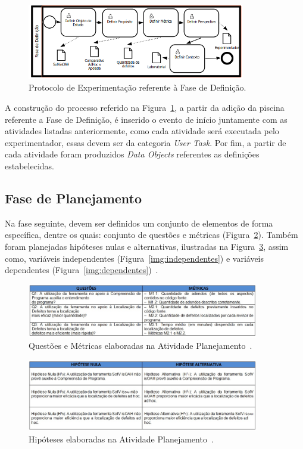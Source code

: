 \begin{figure}[!htb]
\centering
\includegraphics[width=0.85\textwidth]{images/protocolo-definicao.png}
\caption{Protocolo de Experimentação referente à Fase de Definição.}
\label{img:protocolo-definicao}
\end{figure}

A construção do processo referido na Figura~\ref{img:protocolo-definicao}, a partir da adição da piscina referente a Fase de Definição, é inserido o evento de início juntamente com as atividades listadas anteriormente, como cada atividade será executada pelo experimentador, essas devem ser da categoria \textit{User Task}. Por fim, a partir de cada atividade foram produzidos \textit{Data Objects} referentes as definições estabelecidas.

\subsection{Fase de Planejamento}
Na fase seguinte, devem ser definidos um conjunto de elementos de forma específica, dentre os quais: conjunto de questões e métricas (Figura~\ref{img:questoes}). Também foram planejadas hipóteses nulas e alternativas, ilustradas na Figura~\ref{img:hipoteses}, assim como, variáveis independentes (Figura~\ref{img:independentes}) e variáveis dependentes (Figura~\ref{img:dependentes})~\cite{d2012avaliaccao}.

\begin{figure}[!htb]
\centering
\includegraphics[width=0.9\textwidth]{images/tabela-questoes.png}
\caption{Questões e Métricas elaboradas na Atividade Planejamento~\cite{d2012avaliaccao}.}
\label{img:questoes}
\end{figure}

\begin{figure}[!htb]
\centering
\includegraphics[width=0.9\textwidth]{images/tabela-hipoteses.png}
\caption{Hipóteses elaboradas na Atividade Planejamento~\cite{d2012avaliaccao}.}
\label{img:hipoteses}
\end{figure}

